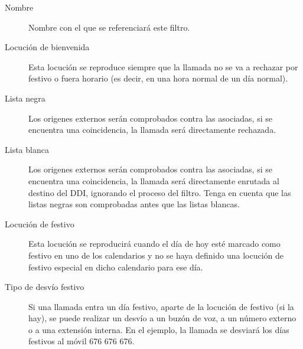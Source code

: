 \documentclass[letterpaper,10pt,spanish]{sphinxmanual}
\begin{document}
\begin{description}
\item[{Nombre}] \leavevmode{}\label{pbx_features/external_filters:term-name}
Nombre con el que se referenciará este filtro.

\item[{Locución de bienvenida}] \leavevmode{}\label{pbx_features/external_filters:term-welcome-locution}
Esta locución se reproduce siempre que la llamada no se va a rechazar por festivo o fuera horario (es decir, en una hora normal de un día normal).

\item[{Lista negra}] \leavevmode{}\label{pbx_features/external_filters:term-black-list}
Los origenes externos serán comprobados contra las {\hyperref[pbx_features/match_lists:match\string-lists]{}} asociadas, si se encuentra una coincidencia, la llamada será directamente rechazada.

\item[{Lista blanca}] \leavevmode{}\label{pbx_features/external_filters:term-white-list}
Los origenes externos serán comprobados contra las {\hyperref[pbx_features/match_lists:match\string-lists]{}} asociadas, si se encuentra una coincidencia, la llamada será directamente enrutada al destino del DDI, ignorando el proceso del filtro. Tenga en cuenta que las listas negras son comprobadas antes que las listas blancas.

\item[{Locución de festivo}] \leavevmode{}\label{pbx_features/external_filters:term-holiday-locution}
Esta locución se reproducirá cuando el día de hoy esté marcado como festivo en uno de los calendarios y no se haya definido una locución de festivo especial en dicho calendario para ese día.

\item[{Tipo de desvío festivo}] \leavevmode{}\label{pbx_features/external_filters:term-holiday-forward-type}
Si una llamada entra un día festivo, aparte de la locución de festivo (si la hay), se puede realizar un desvío a un buzón de voz, a un número externo o a una extensión interna. En el ejemplo, la llamada se desviará los días festivos al móvil 676 676 676.


\end{description}
\end{document}
